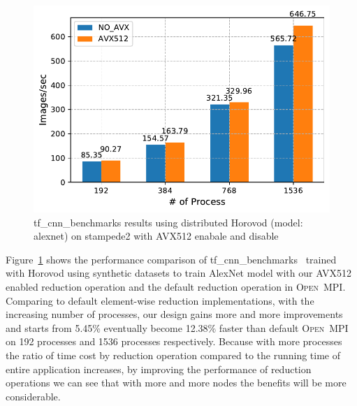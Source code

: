 \documentclass[sigconf]{acmart}
\newcommand{\ompi}[0]{\textsc{Open~MPI}\xspace}
\begin{document}
\begin{figure}[h]
    \centering
    \includegraphics[width=\linewidth]{horovod_tacc.pdf}
    \caption{tf\_cnn\_benchmarks results using distributed Horovod (model: alexnet) on stampede2 with AVX512 enabale and disable}
    \label{fig:horovod_tacc}
\end{figure}

Figure~\ref{fig:horovod_tacc} shows the performance comparison of tf\_cnn\_benchmarks~\cite{cnn_Tensorflow} trained with Horovod using synthetic datasets to train AlexNet model with our AVX512
enabled reduction operation and the default reduction operation in \ompi. Comparing to default element-wise reduction
implementations, with the increasing number of processes,
our design gains more and more improvements and starts from 5.45\% eventually become 12.38\% faster than default \ompi on 192 processes and 1536 processes respectively.
Because with more processes the ratio of time cost by reduction operation compared to the running time of entire application increases, by improving the performance of reduction operations we can see that with more and more nodes the benefits will be more considerable.
\end{document}
